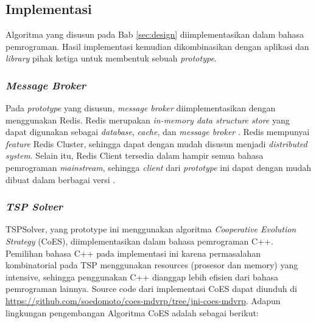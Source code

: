\chapter{\babLima}


\section{Implementasi}
\label{sec:implementation}
Algoritma yang disusun pada Bab \ref{sec:design} diimplementasikan dalam bahasa pemrograman. Hasil implementasi kemudian dikombinasikan dengan aplikasi dan \textit{library} pihak ketiga untuk membentuk sebuah \textit{prototype}.


\subsection{\textit{Message Broker}}
Pada \textit{prototype} yang disusun, \textit{message broker} diimplementasikan dengan menggunakan Redis. Redis merupakan \textit{in-memory data structure store} yang dapat digunakan sebagai \textit{database}, \textit{cache}, dan \textit{message broker} \citep{redis_introduction_2017}. Redis mempunyai \textit{feature} Redis Cluster, sehingga dapat dengan mudah disusun menjadi \textit{distributed system}. Selain itu, Redis Client tersedia dalam hampir semua bahasa pemrograman \textit{mainstream}, sehingga \textit{client} dari \textit{prototype} ini dapat dengan mudah dibuat dalam berbagai versi \citep{redis_clients_2017}.


\subsection{\textit{TSP Solver}}
TSPSolver, yang prototype ini menggunakan algoritma \textit{Cooperative Evolution Strategy} (CoES), diimplementasikan dalam bahasa pemrograman C++. Pemilihan bahasa C++ pada implementasi ini karena permasalahan kombinatorial pada TSP menggunakan resources (prosesor dan memory) yang intensive, sehingga penggunakan C++ dianggap lebih efisien dari bahasa pemrograman lainnya. Source code dari implementasi CoES dapat diunduh di \url{https://github.com/soedomoto/coes-mdvrp/tree/jni-coes-mdvrp}. Adapun lingkungan pengembangan Algoritma CoES adalah sebagai berikut:



